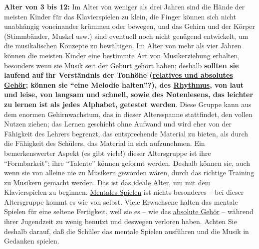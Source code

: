 \textbf{Alter von 3 bis 12:} Im Alter von weniger als drei Jahren sind die Hände der meisten Kinder für das Klavierspielen zu klein, die Finger können sich nicht unabhängig voneinander krümmen oder bewegen, und das Gehirn und der Körper (Stimmbänder, Muskel usw.) sind eventuell noch nicht genügend entwickelt, um die musikalischen Konzepte zu bewältigen.
Im Alter von mehr als vier Jahren können die meisten Kinder eine bestimmte Art von Musikerziehung erhalten, besonders wenn sie Musik seit der Geburt gehört haben; deshalb \textbf{sollten sie laufend auf ihr Verständnis der Tonhöhe (\hyperref[c1iii12]{relatives und absolutes Gehör}; können sie \enquote{eine Melodie halten}?), des \hyperref[c1iii1b]{Rhythmus}, von laut und leise, von langsam  und schnell, sowie des Notenlesens, das leichter zu lernen ist als jedes Alphabet, getestet werden}.
Diese Gruppe kann aus dem enormen Gehirnwachstum, das in dieser Altersspanne stattfindet, den vollen Nutzen ziehen;
das Lernen geschieht ohne Aufwand und wird eher von der Fähigkeit des Lehrers begrenzt, das entsprechende Material zu bieten, als durch die Fähigkeit des Schülers, das Material in sich aufzunehmen.
Ein bemerkenswerter Aspekt (es gibt viele!) dieser Altersgruppe ist ihre \enquote{Formbarkeit}; ihre \enquote{Talente} können geformt werden.
Deshalb können sie, auch wenn sie von alleine nie zu Musikern geworden wären, durch das richtige Training zu Musikern gemacht werden.
Das ist das ideale Alter, um mit dem Klavierspielen zu beginnen.
\hyperref[c1ii12mental]{Mentales Spielen} ist nichts besonderes -- bei dieser Altersgruppe kommt es wie von selbst.
Viele Erwachsene halten das mentale Spielen für eine seltene Fertigkeit, weil sie es -- wie das \hyperref[c1iii12]{absolute Gehör} -- während ihrer Jugendzeit zu wenig benutzt und deswegen verloren haben.
Achten Sie deshalb darauf, daß die Schüler das mentale Spielen ausführen und die Musik in Gedanken spielen.


\label{c1iii18c13}

